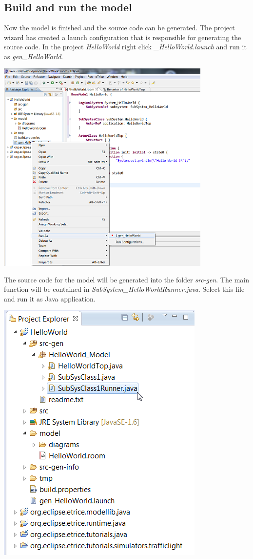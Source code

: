 

\subsection{Build and run the model}

Now the model is finished and the source code can be generated. The project wizard has created a launch 
configuration that is responsible for generating the source code. In the project \textit{HelloWorld} right click \emph{\_HelloWorld.launch} and run it as \emph{gen\_HelloWorld}. 

\includegraphics[width=0.8\textwidth]{images/015-HelloWorld06.png}

The source code for the model will be generated into the folder \emph{src-gen}. The main function will be contained in \emph{SubSystem\_HelloWorldRunner.java}. Select this file and run it as Java application.

\includegraphics{images/015-HelloWorld07.png}


